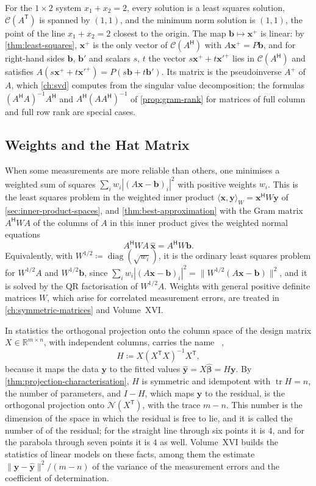 For the $1\times2$ system $x_1+x_2=2$, every solution is a least squares solution, $\mathcal C(A^{\mathsf T})$ is spanned by $(1,1)$, and the minimum norm solution is $(1,1)$, the point of the line $x_1+x_2=2$ closest to the origin. The map $\mathbf b\mapsto\mathbf x^+$ is linear: by \cref{thm:least-squares}, $\mathbf x^+$ is the only vector of $\mathcal C(A^{\mathsf H})$ with $A\mathbf x^+=P\mathbf b$, and for right-hand sides $\mathbf b$, $\mathbf b'$ and scalars $s$, $t$ the vector $s\mathbf x^+ +t\mathbf x'^+$ lies in $\mathcal C(A^{\mathsf H})$ and satisfies $A(s\mathbf x^+ +t\mathbf x'^+)=P(s\mathbf b+t\mathbf b')$. Its matrix is the pseudoinverse $A^+$ of $A$, which \cref{ch:svd} computes from the singular value decomposition; the formulas $(A^{\mathsf H}A)^{-1}A^{\mathsf H}$ and $A^{\mathsf H}(AA^{\mathsf H})^{-1}$ of \cref{prop:gram-rank} for matrices of full column and full row rank are special cases.

\subsection{Weights and the Hat Matrix}

When some measurements are more reliable than others, one minimises a weighted sum of squares $\sum_iw_i|(A\mathbf x-\mathbf b)_i|^2$ with positive weights $w_i$. This is the least squares problem in the weighted inner product $\langle\mathbf x,\mathbf y\rangle_W=\mathbf x^{\mathsf H}W\mathbf y$ of \cref{sec:inner-product-spaces}, and \cref{thm:best-approximation} with the Gram matrix $A^{\mathsf H}WA$ of the columns of $A$ in this inner product gives the weighted normal equations
\[
A^{\mathsf H}WA\,\hat{\mathbf x}=A^{\mathsf H}W\mathbf b .
\]
Equivalently, with $W^{1/2}\coloneqq\operatorname{diag}(\sqrt{w_i})$, it is the ordinary least squares problem for $W^{1/2}A$ and $W^{1/2}\mathbf b$, since $\sum_iw_i|(A\mathbf x-\mathbf b)_i|^2=\|W^{1/2}(A\mathbf x-\mathbf b)\|^2$, and it is solved by the QR factorisation of $W^{1/2}A$. Weights with general positive definite matrices $W$, which arise for correlated measurement errors, are treated in \cref{ch:symmetric-matrices} and Volume~XVI.

In statistics the orthogonal projection onto the column space of the design matrix $X\in\mathbb R^{m\times n}$, with independent columns, carries the name ~\cite{hoaglin1978},
\[
H\coloneqq X(X^{\mathsf T}X)^{-1}X^{\mathsf T},
\]
because it maps the data $\mathbf y$ to the fitted values $\hat{\mathbf y}=X\hat{\boldsymbol\beta}=H\mathbf y$. By \cref{thm:projection-characterisation}, $H$ is symmetric and idempotent with $\operatorname{tr}H=n$, the number of parameters, and $I-H$, which maps $\mathbf y$ to the residual, is the orthogonal projection onto $\mathcal N(X^{\mathsf T})$, with the trace $m-n$. This number is the dimension of the space in which the residual is free to lie, and it is called the number of  of the residual; for the straight line through six points it is $4$, and for the parabola through seven points it is $4$ as well. Volume~XVI builds the statistics of linear models on these facts, among them the estimate $\|\mathbf y-\hat{\mathbf y}\|^2/(m-n)$ of the variance of the measurement errors and the coefficient of determination.

